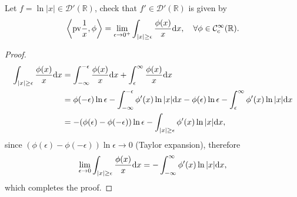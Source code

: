 \begin{pro}
  Let $f = \ln|x|\in\mathcal{D}'(\mathbb{R})$,
  check that $f'\in\mathcal{D}'(\mathbb{R})$ is given by
  \begin{displaymath}
    \left\langle \mathrm{pv}\frac{1}{x}, \phi\right\rangle =
    \lim_{\epsilon\to 0^+}\int_{|x|\ge \epsilon}\frac{\phi(x)}{x}\mathrm{d} x,
    \quad \forall \phi\in\mathcal{C}_c^{\infty}(\mathbb{R}).
  \end{displaymath}
\end{pro}

\begin{proof}
  \begin{align*}
    \int_{|x|\ge\epsilon}\frac{\phi(x)}{x}\mathrm{d} x &= \int_{-\infty}^{-\epsilon}\frac{\phi(x)}{x}\mathrm{d} x + \int_{\epsilon}^{\infty}\frac{\phi(x)}{x}\mathrm{d} x \\
                                                 &= \phi(-\epsilon)\ln\epsilon - \int_{-\infty}^{-\epsilon}\phi'(x)\ln|x|\mathrm{d} x - \phi(\epsilon)\ln\epsilon - \int_{\epsilon}^{\infty}\phi'(x)\ln|x|\mathrm{d} x \\
    &= -(\phi(\epsilon)-\phi(-\epsilon))\ln\epsilon - \int_{|x|\ge\epsilon}\phi'(x)\ln|x|\mathrm{d} x,
  \end{align*}
  since $(\phi(\epsilon)-\phi(-\epsilon))\ln\epsilon\to 0$
  (Taylor expansion),
  therefore
  \begin{displaymath}
    \lim_{\epsilon\to 0}\int_{|x|\ge\epsilon}\frac{\phi(x)}{x}\mathrm{d} x =
    -\int_{-\infty}^{\infty}\phi'(x)\ln|x|\mathrm{d} x,
  \end{displaymath}
  which completes the proof.
\end{proof}
